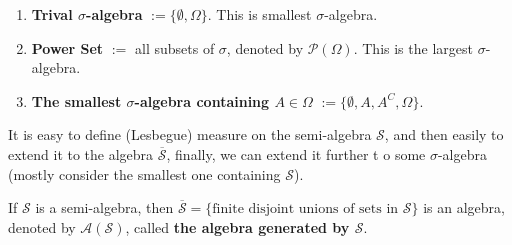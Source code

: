 


\begin{example}
	\begin{enumerate}
		\item \textbf{Trival \(\sigma\)-algebra} \(:=\{\emptyset,\Omega\}\). This is smallest \(\sigma\)-algebra.
		\item \textbf{Power Set} \(:=\) all subsets of \(\sigma\), denoted by \(\mathcal{P}(\Omega)\). This is the largest \(\sigma\)-algebra.
		\item \textbf{The smallest \(\sigma\)-algebra containing \(A\in\Omega\)} \(:=\{\emptyset,A,A^C,\Omega\}\).
	\end{enumerate}
\end{example}

It is easy to define (Lesbegue) measure on the semi-algebra  \(\mathcal{S}\), and then easily to extend it to the algebra \(\overline{\mathcal{S}}\), finally, we can extend it further t o some \(\sigma\)-algebra (mostly consider the smallest one containing \(\mathcal{S}\)).

\begin{lemma}
	If \(\mathcal{S}\) is a semi-algebra, then \(\overline{\mathcal{S}}=\{\text{finite disjoint unions of sets in }\mathcal{S}\}\) is an algebra, denoted by \(\mathcal{A}(\mathcal{S})\), called \textbf{the algebra generated by \(\mathcal{S}\)}.
\end{lemma}

